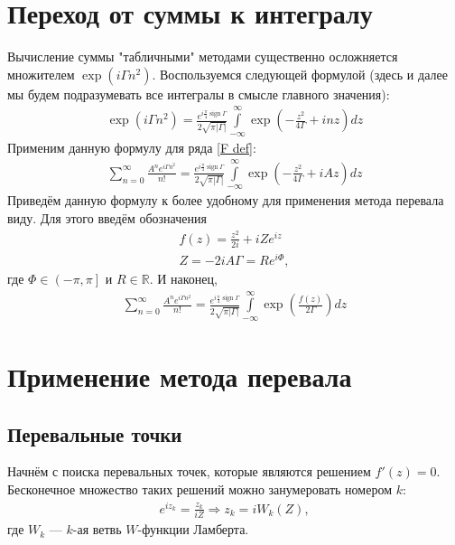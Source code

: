 \documentclass[a4paper, 12pt]{article}
\DeclareMathOperator*{\sign}{sign}
\newenvironment{eqw}{\begin{equation} \begin{aligned}}   
    {\end{aligned}    \end{equation}}
\begin{document}
\section*{Переход от суммы к интегралу}
Вычисление суммы "табличными" методами существенно осложняется множителем $\exp\left(i\Gamma n^2\right)$. Воспользуемся следующей формулой (здесь и далее мы будем подразумевать все интегралы в смысле главного значения):
\begin{eqw}
    \exp\left(i\Gamma n^2\right) = \frac{e^{i\frac{\pi}{4}\sign \Gamma}}{2\sqrt{\pi|\Gamma|}}
    \int\limits_{-\infty}^{\infty} \exp\left(-\frac{z^2}{4\Gamma} + i n z\right) dz
\end{eqw}
Применим данную формулу для ряда \eqref{F def}:
\begin{eqw}
    \sum\limits_{n=0}^{\infty} \frac{A^n e^{i\Gamma n^2}}{n!} = \frac{e^{i\frac{\pi}{4}\sign \Gamma}}{2\sqrt{\pi|\Gamma|}}
    \int\limits_{-\infty}^{\infty} \exp\left(-\frac{z^2}{4\Gamma} + i A z\right) dz
\end{eqw}
Приведём данную формулу к более удобному для применения метода перевала виду. Для этого введём обозначения
\begin{eqw}
    f(z) =  \frac{z^2}{2i} + i Z e^{iz}\\
    Z = -2i A \Gamma = R e^{i\Phi},
\end{eqw}
где $\Phi\in\left(-\pi, \pi\right]$ и $R\in\mathbb{R}$. И наконец, 
\begin{eqw}\label{row to integral}
    \sum\limits_{n=0}^{\infty} \frac{A^n e^{i\Gamma n^2}}{n!} = \frac{e^{i\frac{\pi}{4}\sign \Gamma}}{2\sqrt{\pi|\Gamma|}}
    \int\limits_{-\infty}^{\infty}\exp\left(\frac{f(z)}{2\Gamma}\right)dz 
\end{eqw}

\section*{Применение метода перевала}
\subsection*{Перевальные точки}
Начнём с поиска перевальных точек, которые являются решением $f'(z)=0$. Бесконечное множество таких решений можно занумеровать номером $k$:
\begin{eqw}
    e^{i z_k} = \frac{z_k}{iZ} \Rightarrow   z_k = i W_k(Z),
\end{eqw}
где $W_k$ --- $k$-ая ветвь $W$-функции Ламберта. 
\end{document}
